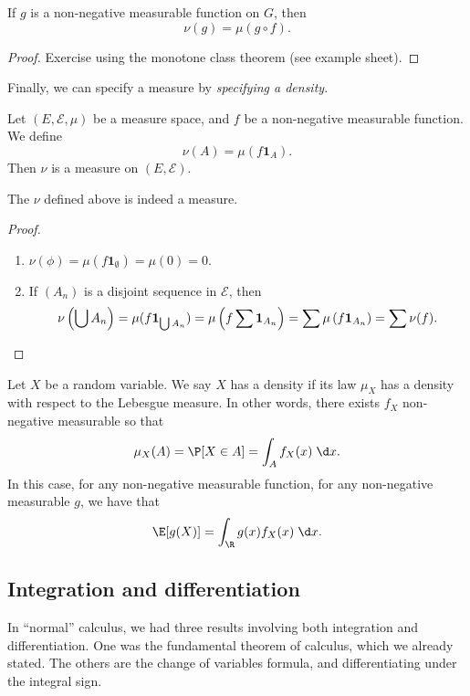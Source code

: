 \documentclass[a4paper]{article}
\begin{document}
\begin{prop}
  If $g$ is a non-negative measurable function on $G$, then
  \[
    \nu(g) = \mu(g \circ f).
  \]
\end{prop}

\begin{proof}
  Exercise using the monotone class theorem (see example sheet).
\end{proof}

Finally, we can specify a measure by \emph{specifying a density}.
\begin{defi}[Density]
  Let $(E, \mathcal{E}, \mu)$ be a measure space, and $f$ be a non-negative measurable function. We define
  \[
    \nu(A) = \mu(f \mathbf{1}_A)
  .\]
  Then $\nu$ is a measure on $(E, \mathcal{E})$.
\end{defi}

\begin{prop}
  The $\nu$ defined above is indeed a measure.
\end{prop}

\begin{proof}\leavevmode
  \begin{enumerate}
    \item $\nu(\phi) = \mu(f\mathbf{1}_\emptyset) = \mu(0) = 0$.
    \item If $(A_n)$ is a disjoint sequence in $\mathcal{E}$, then
      \[
        \nu\left(\bigcup A_n\right) = \mu(f\mathbf{1}_{\bigcup A_n}) = \mu\left(f \sum\mathbf{1}_{A_n}\right) = \sum \mu\left(f \mathbf{1}_{A_n}\right) = \sum \nu(f).\qedhere
      \]
  \end{enumerate}
\end{proof}

\begin{defi}[Density]
  Let $X$ be a random variable. We say $X$ has a density if its law $\mu_X$ has a density with respect to the Lebesgue measure. In other words, there exists $f_X$ non-negative measurable so that
  \[
    \mu_X(A) = \P[X \in A] = \int_A f_X(x)\;\d x.
  \]
  In this case, for any non-negative measurable function, for any non-negative measurable $g$, we have that
  \[
    \E[g(X)] = \int_\R g(x) f_X(x) \;\d x.
  \]
\end{defi}

\subsection{Integration and differentiation}
In ``normal'' calculus, we had three results involving both integration and differentiation. One was the fundamental theorem of calculus, which we already stated. The others are the change of variables formula, and differentiating under the integral sign.
\end{document}
